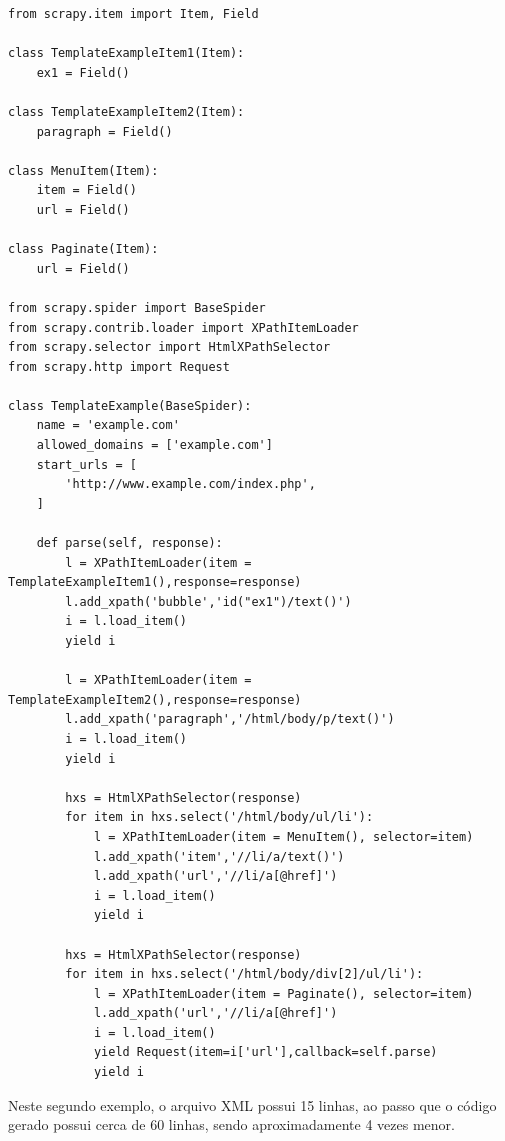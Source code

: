 \begin{lstlisting}[label=spider_python_wpt_exemplo_mais_completo]
from scrapy.item import Item, Field

class TemplateExampleItem1(Item):
    ex1 = Field()

class TemplateExampleItem2(Item):
    paragraph = Field()
    
class MenuItem(Item):
    item = Field()
    url = Field()
    
class Paginate(Item):
    url = Field()

from scrapy.spider import BaseSpider
from scrapy.contrib.loader import XPathItemLoader
from scrapy.selector import HtmlXPathSelector
from scrapy.http import Request

class TemplateExample(BaseSpider):
    name = 'example.com'
    allowed_domains = ['example.com']
    start_urls = [
        'http://www.example.com/index.php',
    ]

    def parse(self, response):
        l = XPathItemLoader(item = TemplateExampleItem1(),response=response)
        l.add_xpath('bubble','id("ex1")/text()') 
        i = l.load_item()
        yield i
        
        l = XPathItemLoader(item = TemplateExampleItem2(),response=response)
        l.add_xpath('paragraph','/html/body/p/text()') 
        i = l.load_item()
        yield i
        
        hxs = HtmlXPathSelector(response)
        for item in hxs.select('/html/body/ul/li'):
            l = XPathItemLoader(item = MenuItem(), selector=item)
            l.add_xpath('item','//li/a/text()') 
            l.add_xpath('url','//li/a[@href]') 
            i = l.load_item()
            yield i

        hxs = HtmlXPathSelector(response)
        for item in hxs.select('/html/body/div[2]/ul/li'):
            l = XPathItemLoader(item = Paginate(), selector=item)
            l.add_xpath('url','//li/a[@href]') 
            i = l.load_item()
            yield Request(item=i['url'],callback=self.parse)
            yield i
\end{lstlisting}

Neste segundo exemplo, o arquivo XML possui 15 linhas, ao passo que o código gerado possui cerca de 60 linhas, sendo aproximadamente 4 vezes menor.

\pagebreak
